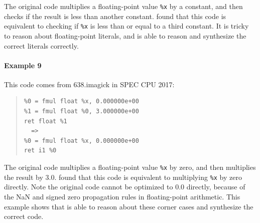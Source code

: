The original code multiplies a floating-point value \texttt{\%x} by a
constant, and then checks if the result is less than another constant.
\minotaur{} found that this code is equivalent to checking if \texttt{\%x}
is less than or equal to a third constant.
It is tricky to reason about floating-point literals, and \minotaur{} is able to
reason and synthesize the correct literals correctly.

\paragraph*{Example 9}

This code comes from 638.imagick in SPEC CPU 2017:

{\begin{quote}\begin{verbatim}
%0 = fmul float %x, 0.000000e+00
%1 = fmul float %0, 3.000000e+00
ret float %1
  =>
%0 = fmul float %x, 0.000000e+00
ret i1 %0
\end{verbatim}
\end{quote}}

The original code multiplies a floating-point value \texttt{\%x} by
zero, and then multiplies the result by 3.0. \minotaur{} found that this
code is equivalent to multiplying \texttt{\%x} by zero directly.
Note the original code cannot be optimized to 0.0 directly, because of
the NaN and signed zero propagation rules in floating-point arithmetic.
This example shows that \minotaur{} is able to reason about these corner
cases and synthesize the correct code.







